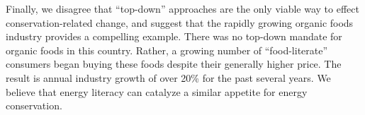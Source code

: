 \documentclass[11pt]{article}
\begin{document}
Finally, we disagree that ``top-down'' approaches are the only viable way
to effect conservation-related change, and suggest that the rapidly growing
organic foods industry provides a compelling example.  There was no
top-down mandate for organic foods in this country. Rather, a growing
number of ``food-literate'' consumers began buying these foods despite
their generally higher price.  The result is annual industry growth of over
20\% for the past several years.  We believe that energy literacy can
catalyze a similar appetite for energy conservation.









\end{document}
